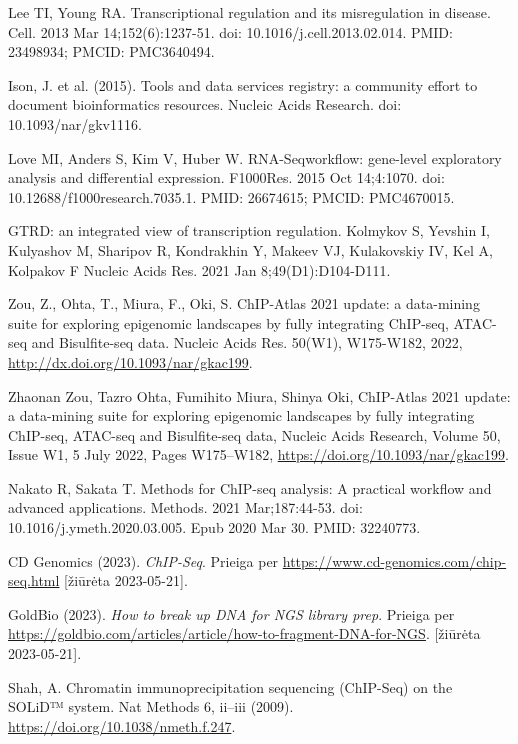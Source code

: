 \documentclass[12pt]{article}
\begin{document}

\begin{thebibliography}{99}

 Lee TI, Young RA. Transcriptional regulation and its
misregulation in disease. Cell. 2013 Mar 14;152(6):1237-51.
doi: 10.1016/j.cell.2013.02.014. PMID: 23498934; PMCID: PMC3640494.

 Ison, J. et al. (2015). Tools and data services registry: a
community effort to document bioinformatics resources. Nucleic Acids Research.
doi: 10.1093/nar/gkv1116.

 Love MI, Anders S, Kim V, Huber W. RNA-Seqworkflow:
gene-level exploratory analysis and differential expression. F1000Res.
2015 Oct 14;4:1070. doi: 10.12688/f1000research.7035.1. PMID: 26674615;
PMCID: PMC4670015.

 GTRD: an integrated view of transcription regulation.
Kolmykov S, Yevshin I, Kulyashov M, Sharipov R, Kondrakhin Y, Makeev VJ,
Kulakovskiy IV, Kel A, Kolpakov F Nucleic Acids Res. 2021 Jan
8;49(D1):D104-D111.

 Zou, Z., Ohta, T., Miura, F., Oki, S. ChIP-Atlas 2021
update: a data-mining suite for exploring epigenomic landscapes by fully
integrating ChIP-seq, ATAC-seq and Bisulfite-seq data. Nucleic Acids Res.
50(W1), W175-W182, 2022, \newline
\url{http://dx.doi.org/10.1093/nar/gkac199}.

 Zhaonan Zou, Tazro Ohta, Fumihito Miura, Shinya Oki,
ChIP-Atlas 2021 update: a data-mining suite for exploring epigenomic landscapes
by fully integrating ChIP-seq, ATAC-seq and Bisulfite-seq data, Nucleic Acids
Research, Volume 50, Issue W1, 5 July 2022, Pages W175–W182,
\url{https://doi.org/10.1093/nar/gkac199}.

 Nakato R, Sakata T. Methods for ChIP-seq analysis: A
practical workflow and advanced applications. Methods. 2021 Mar;187:44-53.
doi: 10.1016/j.ymeth.2020.03.005. Epub 2020 Mar 30. PMID: 32240773.

CD Genomics (2023). \emph{ChIP-Seq}.
Prieiga per \url{https://www.cd-genomics.com/chip-seq.html}
[žiūrėta 2023-05-21].

GoldBio (2023). \emph{How to break up DNA for NGS library prep}.
Prieiga per \url{https://goldbio.com/articles/article/how-to-fragment-DNA-for-NGS}.
[žiūrėta 2023-05-21].

 Shah, A. Chromatin immunoprecipitation sequencing (ChIP-Seq)
on the SOLiD™ system. Nat Methods 6, ii–iii (2009).
\url{https://doi.org/10.1038/nmeth.f.247}.


\end{thebibliography}
\end{document}
